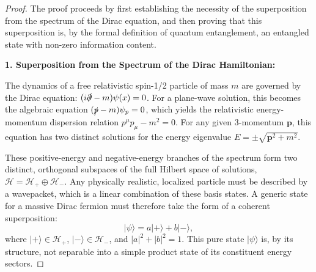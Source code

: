 \documentclass[11pt, letterpaper]{report}
\theoremstyle{plain} %
\theoremstyle{definition} %
\theoremstyle{remark} %
\begin{document}
\begin{proof}
The proof proceeds by first establishing the necessity of the superposition from the spectrum of the Dirac equation, and then proving that this superposition is, by the formal definition of quantum entanglement, an entangled state with non-zero information content.

\textbf{1. Superposition from the Spectrum of the Dirac Hamiltonian:}

The dynamics of a free relativistic spin-1/2 particle of mass $m$ are governed by the Dirac equation: $(i\slashed{\partial} - m) \psi(x) = 0$. For a plane-wave solution, this becomes the algebraic equation $(\slashed{p} - m)\psi_p = 0$, which yields the relativistic energy-momentum dispersion relation $p^\mu p_\mu - m^2 = 0$. For any given 3-momentum $\mathbf{p}$, this equation has two distinct solutions for the energy eigenvalue $E = \pm \sqrt{\mathbf{p}^2 + m^2}$.

These positive-energy and negative-energy branches of the spectrum form two distinct, orthogonal subspaces of the full Hilbert space of solutions, $\mathcal{H} = \mathcal{H}_+ \oplus \mathcal{H}_-$. Any physically realistic, localized particle must be described by a wavepacket, which is a linear combination of these basis states. A generic state for a massive Dirac fermion must therefore take the form of a coherent superposition:
\begin{equation}
    |\psi\rangle = a |+ \rangle + b |-\rangle,
\end{equation}
where $|+\rangle \in \mathcal{H}_+$, $|-\rangle \in \mathcal{H}_-$, and $|a|^2+|b|^2=1$. This pure state $|\psi\rangle$ is, by its structure, not separable into a simple product state of its constituent energy sectors.
\end{proof} 
\end{document}

